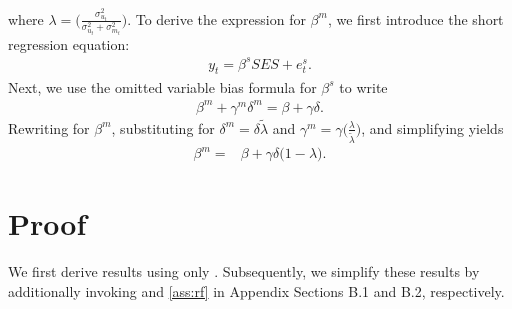 where $\lambda=\Bigg(\frac{\sigma_{u_{t}}^2}{\sigma_{u_{t}}^2+\sigma_{m_{t}}^2} \Bigg)$.
%
To derive the expression for $\beta^m$, we first introduce the short regression equation:
\begin{align}\label{eqn:short}
    y_t=\beta^s SES+e_t^s.
\end{align}
Next, we use the omitted variable bias formula for $\beta^s$ to write
\begin{align}
\beta^{m}+\gamma^{m}\delta^{m}=\beta+\gamma\delta.
\end{align}
Rewriting for $\beta^m$, substituting for $\delta^{m}=\delta\widetilde{\lambda}$ and  $\gamma^{m}=\gamma \Bigg(\frac{\lambda}{\widetilde{\lambda}
}\Bigg)$, and simplifying yields
\begin{align}
\beta^{m}=&\beta+\gamma\delta\bigg(1-\lambda\bigg).
\end{align}

\section{\texorpdfstring{Proof }{proof}}\label{sec:proof_iv}

We first derive results using only . Subsequently, we simplify these results by additionally invoking  and \ref{ass:rf} in Appendix Sections B.1 and B.2, respectively.

